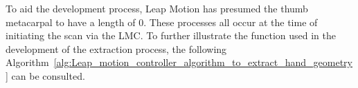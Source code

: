 \renewcommand{\umltextcolor}{black}
\renewcommand{\umldrawcolor}{black}
\renewcommand{\umlfillcolor}{white}

\begin{center}
\end{center}


To aid the development process, Leap Motion has presumed the thumb metacarpal to have a length of 0.
These processes all occur at the time of initiating the scan via the LMC. To further illustrate the function used in the development of the extraction process, the following Algorithm~\ref{alg:Leap_motion_controller_algorithm_to_extract_hand_geometry} can be consulted.
    




